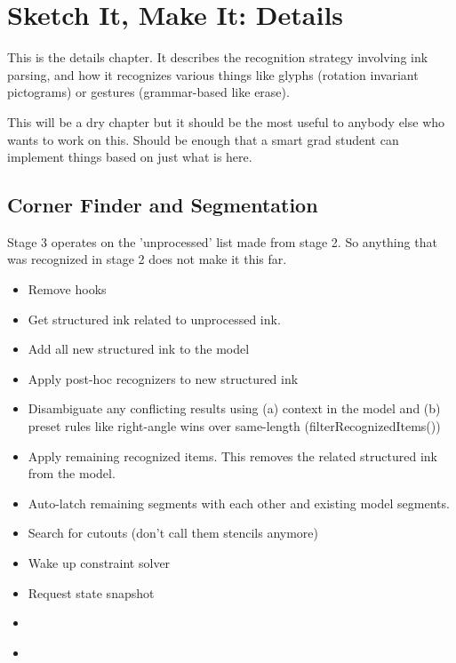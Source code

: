 \chapter{Sketch It, Make It: Details}

This is the details chapter. It describes the recognition strategy
involving ink parsing, and how it recognizes various things like
glyphs (rotation invariant pictograms) or gestures (grammar-based like
erase).

This will be a dry chapter but it should be the most useful to anybody
else who wants to work on this. Should be enough that a smart grad
student can implement things based on just what is here.

\section{Corner Finder and Segmentation}
\label{sec:corner-finder}

Stage 3 operates on the 'unprocessed' list made from stage 2. So
anything that was recognized in stage 2 does not make it this far.

\begin{itemize}
\item Remove hooks
\item Get structured ink related to unprocessed ink.
\item Add all new structured ink to the model
\item Apply post-hoc recognizers to new structured ink
\item Disambiguate any conflicting results using (a) context in the
  model and (b) preset rules like right-angle wins over same-length
  (filterRecognizedItems())
\item Apply remaining recognized items. This removes the related
  structured ink from the model.
\item Auto-latch remaining segments with each other and existing model
  segments.
\item Search for cutouts (don't call them stencils anymore)
\item Wake up constraint solver
\item Request state snapshot
\end{itemize}

\begin{itemize}
\item 
\end{itemize}

\begin{itemize}
\item 
\end{itemize}


